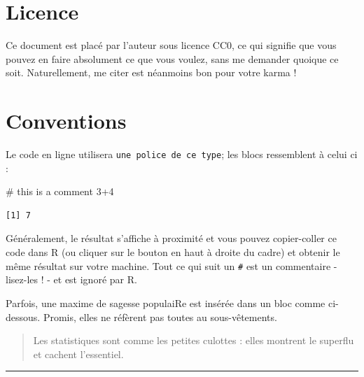 \documentclass[
  letterpaper,
  DIV=11,
  numbers=noendperiod]{scrreprt}
\newenvironment{Shaded}{\begin{snugshade}}{\end{snugshade}}
\newcommand{\CommentTok}[1]{\textcolor[rgb]{0.37,0.37,0.37}{#1}}
\newcommand{\DecValTok}[1]{\textcolor[rgb]{0.68,0.00,0.00}{#1}}
\newcommand{\SpecialCharTok}[1]{\textcolor[rgb]{0.37,0.37,0.37}{#1}}
\begin{document}
\hypertarget{licence}{%
\section*{Licence}\label{licence}}


Ce document est placé par l'auteur sous licence CC0, ce qui signifie que
vous pouvez en faire absolument ce que vous voulez, sans me demander
quoique ce soit. Naturellement, me citer est néanmoins bon pour votre
karma !

\hypertarget{conventions}{%
\section*{Conventions}\label{conventions}}


Le code en ligne utilisera \texttt{une\ police\ de\ ce\ type}; les blocs
ressemblent à celui ci :

\begin{Shaded}
\begin{Highlighting}[]
\CommentTok{\# this is a comment}
\DecValTok{3}\SpecialCharTok{+}\DecValTok{4}
\end{Highlighting}
\end{Shaded}

\begin{verbatim}
[1] 7
\end{verbatim}

Généralement, le résultat s'affiche à proximité et vous pouvez
copier-coller ce code dans R (ou cliquer sur le bouton en haut à droite
du cadre) et obtenir le même résultat sur votre machine. Tout ce qui
suit un \texttt{\#} est un commentaire - lisez-les ! - et est ignoré par
R.

Parfois, une maxime de sagesse populaiRe est insérée dans un bloc comme
ci-dessous. Promis, elles ne réfèrent pas toutes au sous-vêtements.

\begin{quote}
Les statistiques sont comme les petites culottes : elles montrent le
superflu et cachent l'essentiel.
\end{quote}

\begin{center}\rule{0.5\linewidth}{0.5pt}\end{center}

\end{document}
